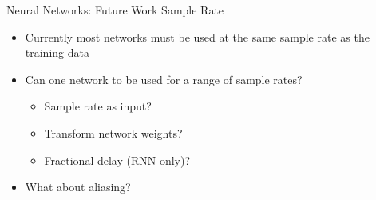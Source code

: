 \begin{frame}{Neural Networks: Future Work}
    Sample Rate
    \begin{itemize}
        \itemsep0.5em
        \item Currently most networks must be used at the same sample rate as the training data
        \item Can one network to be used for a range of sample rates?
        \begin{itemize}
            \itemsep0em
            \item Sample rate as input?
            \item Transform network weights?
            \item Fractional delay (RNN only)?
        \end{itemize}
        \item What about aliasing?
    \end{itemize}
\end{frame}
